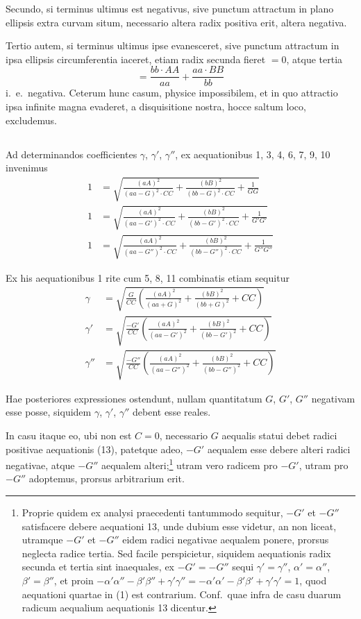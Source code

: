 \documentclass[12pt,a4paper]{article}
\begin{document}
Secundo, si terminus ultimus est negativus, sive punctum attractum in plano ellipsis extra curvam situm, necessario altera radix positiva erit, altera negativa.

Tertio autem, si terminus ultimus ipse evanesceret, sive punctum attractum in ipsa ellipsis circumferentia iaceret, etiam radix secunda fieret $=0$, atque tertia
\[
= \frac{bb\cdot AA}{aa} + \frac{aa\cdot BB}{bb}
\]
i.~e.\ negativa. Ceterum hunc casum, physice impossibilem, et in quo attractio ipsa infinite magna evaderet, a disquisitione nostra, hocce saltum loco, excludemus.

\setcounter{subsection}{6}
\subsection{}

Ad determinandos coefficientes $\gamma$, $\gamma'$, $\gamma''$, ex aequationibus 1, 3, 4, 6, 7, 9, 10 invenimus
\[
\begin{aligned}
1 &= \sqrt{\frac{(aA)^2}{(aa-G)^2\cdot CC} + \frac{(bB)^2}{(bb-G)^2\cdot CC} + \frac{1}{GG}} \\
1 &= \sqrt{\frac{(aA)^2}{(aa-G')^2\cdot CC} + \frac{(bB)^2}{(bb-G')^2\cdot CC} + \frac{1}{G'G'}} \\
1 &= \sqrt{\frac{(aA)^2}{(aa-G'')^2\cdot CC} + \frac{(bB)^2}{(bb-G'')^2\cdot CC} + \frac{1}{G''G''}}
\end{aligned}
\]

Ex his aequationibus 1 rite cum 5, 8, 11 combinatis etiam sequitur
\[
\begin{aligned}
\gamma &= \sqrt{\frac{G}{CC}\left(\frac{(aA)^2}{(aa+G)^2} + \frac{(bB)^2}{(bb+G)^2} + CC\right)} \\
\gamma' &= \sqrt{\frac{-G'}{CC}\left(\frac{(aA)^2}{(aa-G')^2} + \frac{(bB)^2}{(bb-G')^2} + CC\right)} \\
\gamma'' &= \sqrt{\frac{-G''}{CC}\left(\frac{(aA)^2}{(aa-G'')^2} + \frac{(bB)^2}{(bb-G'')^2} + CC\right)}
\end{aligned}
\tag{15}
\]

Hae posteriores expressiones ostendunt, nullam quantitatum $G$, $G'$, $G''$ negativam esse posse, siquidem $\gamma$, $\gamma'$, $\gamma''$ debent esse reales.

In casu itaque eo, ubi non est $C=0$, necessario $G$ aequalis statui debet radici positivae aequationis (13), patetque adeo, $-G'$ aequalem esse debere alteri radici negativae, atque $-G''$ aequalem alteri;\footnote{Proprie quidem ex analysi praecedenti tantummodo sequitur, $-G'$ et $-G''$ satisfacere debere aequationi 13, unde dubium esse videtur, an non liceat, utramque $-G'$ et $-G''$ eidem radici negativae aequalem ponere, prorsus neglecta radice tertia. Sed facile perspicietur, siquidem aequationis radix secunda et tertia sint inaequales, ex $-G' = -G''$ sequi $\gamma'=\gamma''$, $\alpha'=\alpha''$, $\beta'=\beta''$, et proin $-\alpha'\alpha'' - \beta'\beta'' + \gamma'\gamma'' = -\alpha'\alpha' - \beta'\beta' + \gamma'\gamma' = 1$, quod aequationi quartae in (1) est contrarium. Conf.\ quae infra de casu duarum radicum aequalium aequationis 13 dicentur.} utram vero radicem pro $-G'$, utram pro $-G''$ adoptemus, prorsus arbitrarium erit.
\end{document}
